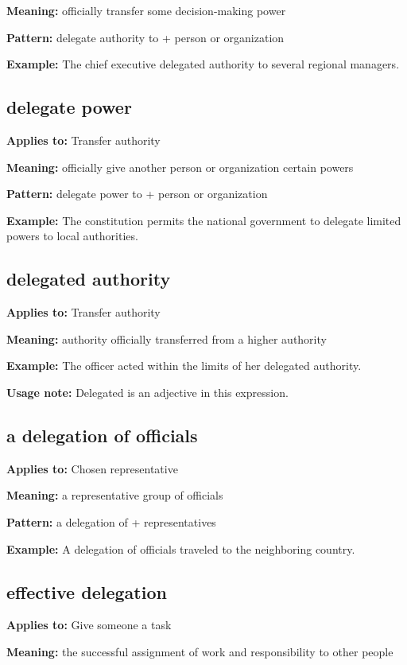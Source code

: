\documentclass[11pt]{article}
\begin{document}
\textbf{Meaning:} officially transfer some decision-making power

\textbf{Pattern:} delegate authority to + person or organization

\textbf{Example:} The chief executive delegated authority to several regional managers.

\subsection{delegate power}
\textbf{Applies to:} Transfer authority

\textbf{Meaning:} officially give another person or organization certain powers

\textbf{Pattern:} delegate power to + person or organization

\textbf{Example:} The constitution permits the national government to delegate limited powers to local authorities.

\subsection{delegated authority}
\textbf{Applies to:} Transfer authority

\textbf{Meaning:} authority officially transferred from a higher authority

\textbf{Example:} The officer acted within the limits of her delegated authority.

\textbf{Usage note:} Delegated is an adjective in this expression.

\subsection{a delegation of officials}
\textbf{Applies to:} Chosen representative

\textbf{Meaning:} a representative group of officials

\textbf{Pattern:} a delegation of + representatives

\textbf{Example:} A delegation of officials traveled to the neighboring country.

\subsection{effective delegation}
\textbf{Applies to:} Give someone a task

\textbf{Meaning:} the successful assignment of work and responsibility to other people
\end{document}
